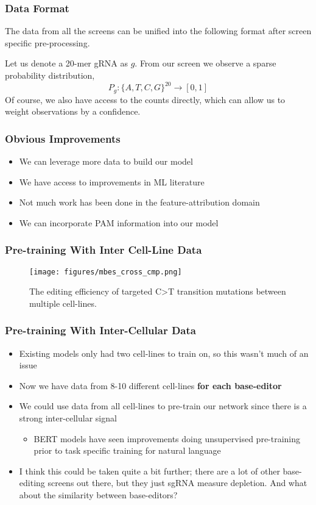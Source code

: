 \documentclass{beamer}
\begin{document}
\begin{frame}
  \frametitle{Data Format}

  The data from all the screens can be unified into the following
  format after screen specific pre-processing.

  Let us denote a 20-mer gRNA as $g$. From our screen we observe a
  sparse probability distribution,
  $$P_g : \{A,T,C,G\}^{20} \rightarrow [0, 1]$$
  Of course, we also have access to the counts directly, which can
  allow us to weight observations by a confidence.
  
\end{frame}
\begin{frame}
  \frametitle{Obvious Improvements}

  \begin{itemize}
  \item We can leverage more data to build our model
  \item We have access to improvements in ML literature
  \item Not much work has been done in the feature-attribution domain
  \item We can incorporate PAM information into our model
  \end{itemize}
\end{frame}

\begin{frame}
  \frametitle{Pre-training With Inter Cell-Line Data}

  \begin{figure}[ht]
    \centering
    \texttt{[image: figures/mbes\_cross\_cmp.png]}
    \caption{\label{fig:label} The editing efficiency of targeted
      C\textgreater T transition mutations between multiple
      cell-lines.}
  \end{figure}
\end{frame}

\begin{frame}
  \frametitle{Pre-training With Inter-Cellular Data}

  \begin{itemize}
  \item Existing models only had two cell-lines to train on, so this
    wasn't much of an issue
  \item Now we have data from 8-10 different cell-lines \textbf{for
      each base-editor} 
  \item We could use data from all cell-lines to pre-train our network
    since there is a strong inter-cellular signal
    \begin{itemize}
    \item BERT models have seen improvements doing unsupervised
      pre-training prior to task specific training for natural language
    \end{itemize}
  \item I think this could be taken quite a bit further; there are a
    lot of other base-editing screens out there, but they just sgRNA
    measure depletion. And what about the similarity between
    base-editors?
  \end{itemize}
\end{frame}
\end{document}
